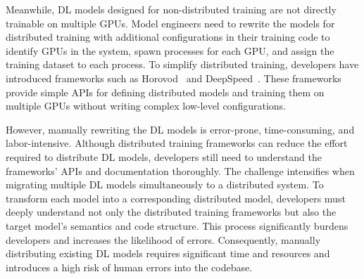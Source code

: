 Meanwhile, DL models designed for non-distributed training are not directly
trainable on multiple GPUs.
Model engineers need to rewrite the models for distributed training
with additional configurations in their training code to identify GPUs in the
system, spawn processes for each GPU, and assign the training dataset to each
process.
To simplify distributed training, developers have introduced frameworks such as
Horovod~\cite{sergeev2018horovod} and DeepSpeed~\cite{deepspeed}. 
These frameworks provide simple APIs for defining distributed models and
training them on multiple GPUs without writing complex low-level
configurations. 

However, manually rewriting the DL models is error-prone, time-consuming, and
labor-intensive.
Although distributed training frameworks can reduce the effort required to
distribute DL models, developers still need to understand the frameworks' APIs
and documentation thoroughly.
The challenge intensifies when migrating multiple DL models simultaneously to a
distributed system.
To transform each model into a corresponding distributed model, developers must
deeply understand not only the distributed training frameworks but also the
target model's semantics and code structure.
This process significantly burdens developers and increases the likelihood of
errors.
Consequently, manually distributing existing DL models requires significant
time and resources and introduces a high risk of human errors into the
codebase.



